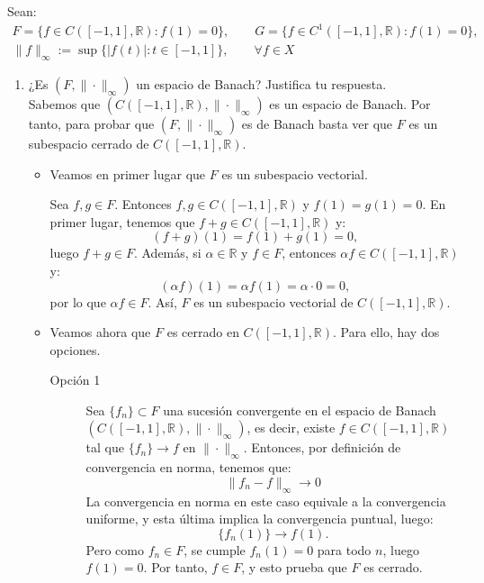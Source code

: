 \documentclass[12pt]{article}
\begin{document}
    \begin{ejercicio}[3 puntos]
        Sean:
        \begin{gather*}
            F=\{f\in C([-1,1],\mathbb{R}) : f(1) = 0\}, \qquad G = \{f\in C^1([-1,1],\mathbb{R}) : f(1) = 0\}, \\
            \|f\|_\infty := \sup\{|f(t)|:t\in [-1,1]\}, \qquad \forall f\in X
        \end{gather*}
        \begin{enumerate}[label=\alph*)]
            \item ¿Es $(F,\|\cdot \|_\infty)$ un espacio de Banach? Justifica tu respuesta.\\
            Sabemos que $(C([-1,1],\mathbb{R}),\|\cdot\|_\infty)$ es un espacio de Banach.
            Por tanto, para probar que $(F,\|\cdot\|_\infty)$ es de Banach basta ver que $F$ es un subespacio cerrado de $C([-1,1],\mathbb{R})$.
            \begin{itemize}
                \item Veamos en primer lugar que $F$ es un subespacio vectorial.
            
                Sea $f,g\in F$. Entonces $f,g\in C([-1,1],\mathbb{R})$ y $f(1)=g(1)=0$. En primer lugar, tenemos que $f+g\in C([-1,1],\mathbb{R})$ y:
                \[
                (f+g)(1)=f(1)+g(1)=0,
                \]
                luego $f+g\in F$. Además, si $\alpha\in\mathbb{R}$ y $f\in F$, entonces $\alpha f\in C([-1,1],\mathbb{R})$ y:
                \[
                (\alpha f)(1)=\alpha f(1)=\alpha\cdot 0=0,
                \]
                por lo que $\alpha f\in F$.
                Así, $F$ es un subespacio vectorial de $C([-1,1],\mathbb{R})$.


                \item Veamos ahora que $F$ es cerrado en $C([-1,1],\mathbb{R})$. Para ello, hay dos opciones.
                \begin{description}
                    \item[Opción 1] 
                        Sea $\{f_n\}\subset F$ una sucesión convergente en el espacio de Banach $(C([-1,1],\mathbb{R}),\|\cdot\|_\infty)$, es decir, existe $f\in C([-1,1],\mathbb{R})$ tal que $\{f_n\}\to f$ en $\|\cdot\|_\infty$. Entonces, por definición de convergencia en norma, tenemos que:
                        \[
                        \|f_n-f\|_\infty \longrightarrow 0
                        \]
                        La convergencia en norma en este caso equivale a la convergencia uniforme, y esta última implica la convergencia puntual, luego:
                        \[
                        \{f_n(1)\}\longrightarrow f(1).
                        \]
                        Pero como $f_n\in F$, se cumple $f_n(1)=0$ para todo $n$, luego $f(1)=0$. Por tanto, $f\in F$, y esto prueba que $F$ es cerrado.


\end{description}
\end{itemize}
\end{enumerate}
\end{ejercicio}
\end{document}

